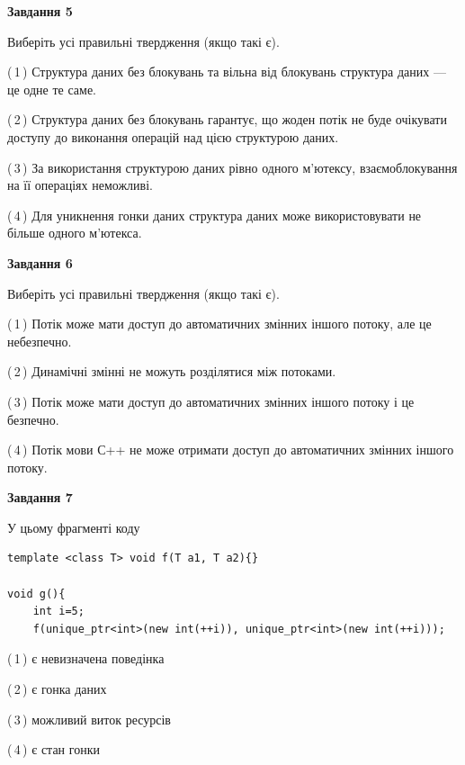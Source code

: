 \documentclass[12pt, ukrainian]{article}
\begin{document}
\begin {large}
{\begin{center}
\textbf{Завдання 5}
\end{center}

Виберіть усі правильні твердження (якщо такі є).\par
\vspace{2mm}

(\,1\,) Структура даних без блокувань та вільна від блокувань структура даних --- це одне те саме.%

(\,2\,) Структура даних без блокувань гарантує, що жоден потік не буде очікувати доступу до виконання операцій над цією структурою даних.%

(\,3\,) За використання структурою даних рівно одного м’ютексу, взаємоблокування на її операціях неможливі.%

(\,4\,) Для уникнення гонки даних структура даних може використовувати не більше одного м’ютекса.%
\newpage


\begin{center}
\textbf{Завдання 6}
\end{center}

Виберіть усі правильні твердження (якщо такі є).\par
\vspace{2mm}

(\,1\,) Потік може мати доступ до автоматичних змінних іншого потоку, але це небезпечно.%

(\,2\,) Динамічні змінні не можуть розділятися між потоками.%

(\,3\,) Потік може мати доступ до автоматичних змінних іншого потоку і це безпечно.%

(\,4\,) Потік мови С++ не може отримати доступ до автоматичних змінних іншого потоку.%


\begin{center}
\textbf{Завдання 7}
\end{center}

У цьому фрагменті коду
\begin{verbatim}
template <class T> void f(T a1, T a2){}

void g(){
    int i=5;
    f(unique_ptr<int>(new int(++i)), unique_ptr<int>(new int(++i)));
\end{verbatim}

(\,1\,) є невизначена поведінка%

(\,2\,) є гонка даних%

(\,3\,) можливий виток ресурсів%

(\,4\,) є стан гонки%

}
\end {large}

\vspace{4mm}
\newpage
\end{document}
